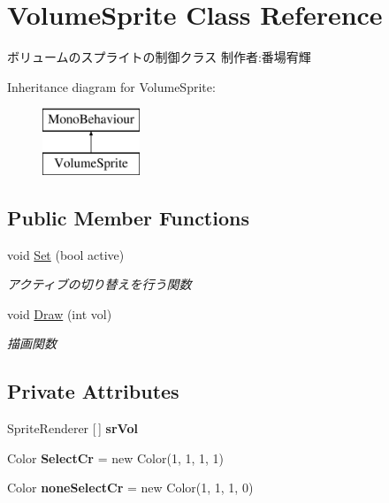 \hypertarget{class_volume_sprite}{}\section{Volume\+Sprite Class Reference}
\label{class_volume_sprite}


ボリュームのスプライトの制御クラス 制作者\+:番場宥輝  


Inheritance diagram for Volume\+Sprite\+:\begin{figure}[H]
\begin{center}
\leavevmode
\includegraphics[height=2.000000cm]{class_volume_sprite}
\end{center}
\end{figure}
\subsection*{Public Member Functions}
\begin{DoxyCompactItemize}
\item 
void \hyperlink{class_volume_sprite_a33b0a404f6879369596d21e4d6779b28}{Set} (bool active)
\begin{DoxyCompactList}\small\item\em アクティブの切り替えを行う関数 \end{DoxyCompactList}\item 
void \hyperlink{class_volume_sprite_a24b4abdf5e733c8c4441a92319d6c73a}{Draw} (int vol)
\begin{DoxyCompactList}\small\item\em 描画関数 \end{DoxyCompactList}\end{DoxyCompactItemize}
\subsection*{Private Attributes}
\begin{DoxyCompactItemize}
\item 
\mbox{\label{class_volume_sprite_a669daee83a1267ff64d5a529b8d8fb1a}} 
Sprite\+Renderer \mbox{[}$\,$\mbox{]} {\bfseries sr\+Vol}
\item 
\mbox{\label{class_volume_sprite_ade8e6e9233b502791388f8f4c8c9db02}} 
Color {\bfseries Select\+Cr} = new Color(1, 1, 1, 1)
\item 
\mbox{\label{class_volume_sprite_a365a693407fb4b6c5866ef217c40a99f}} 
Color {\bfseries none\+Select\+Cr} = new Color(1, 1, 1, 0)
\end{DoxyCompactItemize}


